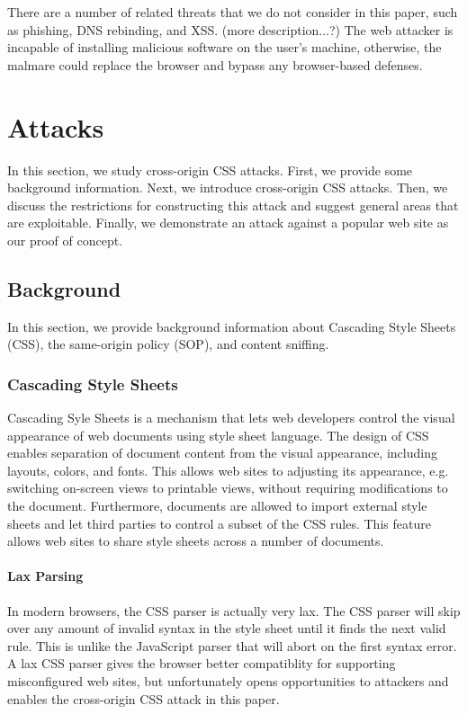 \documentclass{acm_proc_article-sp}
\begin{document}
There are a number of related threats that we do not consider in this paper, such as phishing, DNS rebinding, and XSS.
(more description...?)
The web attacker is incapable of installing malicious software on the user's machine, otherwise, the malmare could replace the browser and bypass any browser-based defenses.

\section{Attacks}
In this section, we study cross-origin CSS attacks. First, we provide some background information. Next, we introduce cross-origin CSS attacks. Then, we discuss the restrictions for constructing this attack and suggest general areas that are exploitable. Finally, we demonstrate an attack against a popular web site as our proof of concept.

\subsection{Background}
In this section, we provide background information about Cascading Style Sheets (CSS), the same-origin policy (SOP), and content sniffing.

\subsubsection{Cascading Style Sheets}
Cascading Syle Sheets\cite{css} is a mechanism that lets web developers control the visual appearance of web documents using style sheet language. The design of CSS enables separation of document content from the visual appearance, including layouts, colors, and fonts. This allows web sites to adjusting its appearance, e.g. switching on-screen views to printable views, without requiring modifications to the document. Furthermore, documents are allowed to import external style sheets and let third parties to control a subset of the CSS rules. This feature allows web sites to share style sheets across a number of documents.

\paragraph{Lax Parsing}
In modern browsers, the CSS parser is actually very lax. The CSS parser will skip over any amount of invalid syntax in the style sheet until it finds the next valid rule. This is unlike the JavaScript parser that will abort on the first syntax error. A lax CSS parser gives the browser better compatiblity for supporting misconfigured web sites, but unfortunately opens opportunities to attackers and enables the cross-origin CSS attack in this paper.
\end{document}
